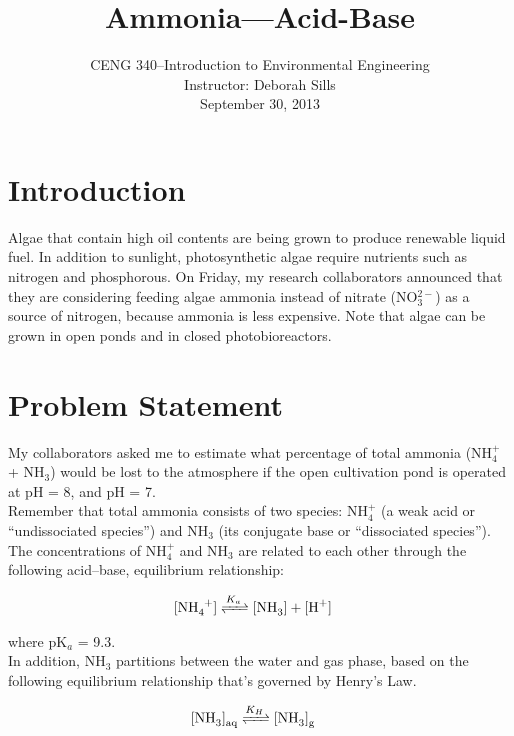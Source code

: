 \documentclass[12pt,letterpaper]{article}
\begin{document}
\setlength{\parindent}{0cm} 


\frenchspacing

\title {Ammonia---Acid-Base}
\author {CENG 340--Introduction to Environmental Engineering\\
Instructor: Deborah Sills\\September 30, 2013}
\date {}
\maketitle

\section *{Introduction}
Algae that contain high oil contents are being grown to produce renewable liquid fuel.  In addition to sunlight, photosynthetic algae require nutrients such as nitrogen and phosphorous.  On Friday, my research collaborators announced that they are considering feeding algae ammonia instead of nitrate (NO$_3^{2-}$) as a source of nitrogen, because ammonia is less expensive.  Note that algae can be grown in open ponds and in closed photobioreactors.


\section *{Problem Statement}

My collaborators asked me to estimate what percentage of total ammonia (NH$_4^+$ + NH$_3$) would be lost to the atmosphere if the open cultivation pond is operated at pH = 8, and pH = 7.\\

Remember that total ammonia consists of two species: NH$_4^+$ (a weak acid or ``undissociated species'') and  NH$_3$ (its conjugate base or ``dissociated species''). The concentrations of NH$_4^+$ and NH$_3$ are related to each other through the following acid--base, equilibrium relationship:

\begin{align*}
\cee{[NH_4^+] &<=>[K_a] [NH_3] + [H^+]}
\end{align*}

where pK$_a$ = 9.3.\\

In addition, NH$_3$ partitions between the water and gas phase, based on the following equilibrium relationship that's governed by Henry's Law.

\begin{align*}
\cee{[NH_3]_{aq} &<=>[K_H] [NH_3]_g}
\end{align*}
\end{document}
